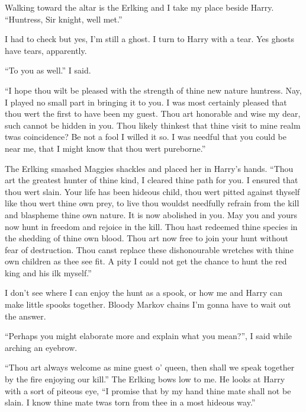 Walking toward the altar is the Erlking and I take my place beside Harry.\\

	``Huntress, Sir knight, well met.''

I had to check but yes, I'm still a ghost. I turn to Harry with a tear. Yes ghosts have tears, apparently.

``To you as well.'' I said.
	
	``I hope thou wilt be pleased with the strength of thine new nature huntress. Nay, I played no small part in bringing it to you. I was most certainly pleased that thou wert the first to have been my guest. Thou art honorable and wise my dear, such cannot be hidden in you. Thou likely thinkest that thine visit to mine realm twas coincidence? Be not a fool I willed it so. I was needful that you could be near me, that I might know that thou wert pureborne.''

	The Erlking smashed Maggies shackles and placed her in Harry's hands. ``Thou art the greatest hunter of thine kind, I cleared thine path for you. I ensured that thou wert slain. Your life has been hideous child, thou wert pitted against thyself like thou wert thine own prey, to live thou wouldst needfully refrain from the kill and blaspheme thine own nature. It is now abolished in you. May you and yours now hunt in freedom and rejoice in the kill. Thou hast redeemed thine species in the shedding of thine own blood. Thou art now free to join your hunt without fear of destruction. Thou canst replace these dishonourable wretches with thine own children as thee see fit. A pity I could not get the chance to hunt the red king and his ilk myself.''
	
	I don't see where I can enjoy the hunt as a spook, or how me and Harry can make little spooks together. Bloody Markov chains I'm gonna have to wait out the answer.

``Perhaps you might elaborate more and explain what you mean?'', I said while arching an eyebrow.
	
	``Thou art always welcome as mine guest o' queen, then shall we speak together by the fire enjoying our kill.'' The Erlking bows low to me. He looks at Harry with a sort of piteous eye, ``I promise that by my hand thine mate shall not be slain. I know thine mate twas torn from thee in a most hideous way.''\\

